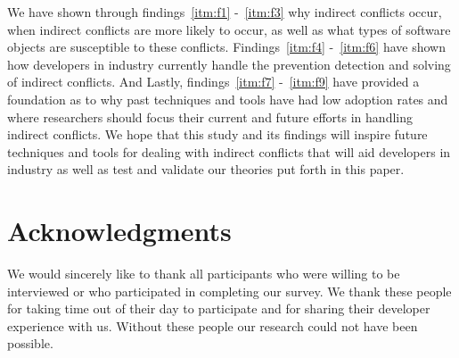 \documentclass[conference]{IEEEtran}
\begin{document}
We have shown through findings~\ref{itm:f1} -~\ref{itm:f3} why indirect conflicts occur, when indirect conflicts are more likely to
occur, as well as what types of software objects are susceptible to these conflicts. Findings~\ref{itm:f4} -~\ref{itm:f6} have shown
how developers in industry currently handle the prevention detection and solving of indirect conflicts. And Lastly, findings~\ref{itm:f7} 
-~\ref{itm:f9} have provided a foundation as to why past techniques and tools have had low adoption rates and where
researchers should focus their current and future efforts in handling indirect conflicts. We hope that this study and its 
findings will inspire future techniques and tools for dealing with indirect conflicts that 
will aid developers in industry as well as test and validate our theories put forth in this paper.

\section{Acknowledgments}

We would sincerely like to thank all participants who were willing to be interviewed or who participated
in completing our survey. We thank these people for taking time out of their day to participate and for
sharing their developer experience with us. Without these people our research could not have been possible.


\balance


\end{document}
